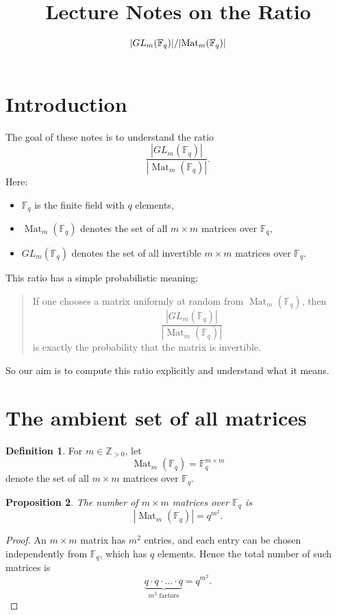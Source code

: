 \documentclass[11pt]{article}
\title{Lecture Notes on the Ratio \(\lvert GL_m(\F_q)\rvert / \lvert \Mat_m(\F_q)\rvert\)}
\author{}
\date{}
\newcommand{\F}{\mathbb{F}}
\newcommand{\Mat}{\operatorname{Mat}}
\theoremstyle{definition}
\newtheorem{definition}{Definition}[section]
\theoremstyle{plain}
\newtheorem{proposition}[definition]{Proposition}
\begin{document}
	
	\maketitle
	
	\tableofcontents
	
	\section{Introduction}
	
	The goal of these notes is to understand the ratio
	\[
	\frac{|GL_m(\F_q)|}{|\Mat_m(\F_q)|}.
	\]
	Here:
	\begin{itemize}[leftmargin=2em]
		\item \(\F_q\) is the finite field with \(q\) elements,
		\item \(\Mat_m(\F_q)\) denotes the set of all \(m\times m\) matrices over \(\F_q\),
		\item \(GL_m(\F_q)\) denotes the set of all invertible \(m\times m\) matrices over \(\F_q\).
	\end{itemize}
	
	This ratio has a simple probabilistic meaning:
	
	\begin{quote}
		If one chooses a matrix uniformly at random from \(\Mat_m(\F_q)\), then
		\[
		\frac{|GL_m(\F_q)|}{|\Mat_m(\F_q)|}
		\]
		is exactly the probability that the matrix is invertible.
	\end{quote}
	
	So our aim is to compute this ratio explicitly and understand what it means.
	
	\section{The ambient set of all matrices}
	
	\begin{definition}
		For \(m\in \mathbb{Z}_{>0}\), let
		\[
		\Mat_m(\F_q)=\F_q^{m\times m}
		\]
		denote the set of all \(m\times m\) matrices over \(\F_q\).
	\end{definition}
	
	\begin{proposition}
		The number of \(m\times m\) matrices over \(\F_q\) is
		\[
		|\Mat_m(\F_q)|=q^{m^2}.
		\]
	\end{proposition}
	
	\begin{proof}
		An \(m\times m\) matrix has \(m^2\) entries, and each entry can be chosen independently from \(\F_q\), which has \(q\) elements. Hence the total number of such matrices is
		\[
		\underbrace{q\cdot q\cdot \dots \cdot q}_{m^2\text{ factors}}=q^{m^2}.
		\]
	\end{proof}
	
\end{document}
